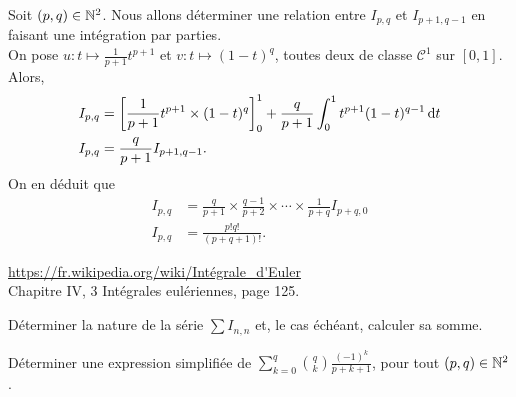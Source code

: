 \begin{preuve}
    Soit $(p,q) \in \mathbb{N}^2$. Nous allons déterminer une relation entre $I_{p,q}$ et $I_{p+1, q-1}$ en faisant une intégration par parties. \\
    On pose $u:t\mapsto \frac{1}{p+1} t^{p+1}$ et $v:t\mapsto (1-t)^q$, toutes deux de classe $\mathscr{C}^1$ sur $[0, 1]$. Alors, 
    \begin{align*}
        I_{p,q} &= \left[ \frac{1}{p+1}t^{p+1} \times (1-t)^q \right]_0^1 + \frac{q}{p+1} \int_0^1 t^{p+1} (1-t)^{q-1} \, \mathrm{d} t \\
        I_{p,q} &= \frac{q}{p+1} I_{p+1, q-1}.
    \end{align*}
    On en déduit que 
    \begin{align*}
        I_{p,q} &= \frac{q}{p+1} \times \frac{q-1}{p+2} \times \cdots \times \frac{1}{p+q} I_{p+q,0} \\
        I_{p,q} &= \frac{p! q!}{(p + q + 1)!}.
    \end{align*}
\end{preuve}

\url{https://fr.wikipedia.org/wiki/Intégrale_d'Euler} \\
\cite{calcul_infinitesimal} Chapitre IV, 3 Intégrales eulériennes, page 125.

\begin{exercice}
    Déterminer la nature de la série $\sum I_{n,n}$ et, le cas échéant, calculer sa somme. 
\end{exercice}

\begin{exercice}
    Déterminer une expression simplifiée de $\sum\limits_{k=0}^q \binom{q}{k} \frac{(-1)^k}{p+k+1}$, pour tout $(p, q) \in \mathbb{N}^2$.
\end{exercice}

\begin{solution}
\end{solution}
